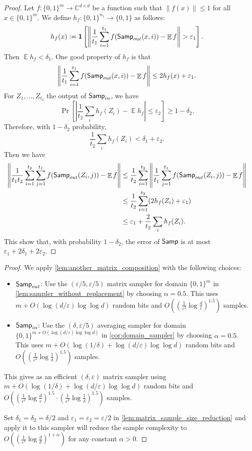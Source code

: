 \documentclass[11pt,letterpaper]{article}
\newcommand{\C}{\mathbb{C}}
\DeclareMathOperator*{\E}{\mathbb{E}}
\newcommand{\eps}{\varepsilon}
\newcommand{\1}{\mathbbm{1}}
\newcommand{\norm}[1]{\left\lVert #1\right\rVert}
\newcommand{\abs}[1]{\left|#1\right| }
\newcommand{\zo}{\{0, 1\}}
\newcommand{\Smp}{\textup{\textsf{Samp}}}
\begin{document}
\begin{proof}
    Let $f : \zo^m \to \C^{d \times d}$ be a function such that $\|f(x)\| \leq 1$ for all $x \in \zo^m$.
    We define $h_f:\zo^{n_1} \to \{0, 1\}$ as follows: \[
        h_f(x) := \mathbf{1}\left[\norm{\frac{1}{t_1}\sum_{i=1}^{t_1} f(\Smp_{out}(x, i)) - \E f} > \eps_1\right].
    \] Then $\E h_f < \delta_1$. One good property of $h_f$ is that \[
        \norm{\frac{1}{t_1}\sum_{i=1}^{t_1} f(\Smp_{out}(x, i)) - \E f} \le 2h_f(x) + \eps_1.
    \]
    For $Z_1, \dots, Z_{t_2}$ the output of $\Smp_{in}$, we have     \[
    \Pr
    \left[ \abs{\frac{1}{t_2}  \sum_i h_f(Z_i) - \E h_f} \leq \varepsilon_2 \right]
    \geq 1 - \delta_2.
    \]
    Therefore, with $1 - \delta_2$ probability, \[
        {\frac{1}{t_2}  \sum_i h_f(Z_i)} < \delta_1 + \eps_2.
    \]
    Then we have 
    \begin{align*}
        \norm{\frac{1}{t_1t_2}\sum_{i=1}^{t_2}\sum_{j=1}^{t_1}f(\Smp_{out}(Z_i, j)) - \E f} &\le \frac{1}{t_2}\sum_{i=1}^{t_2} \norm{\frac{1}{t_1} \sum_{j=1}^{t_1} f(\Smp_{out}(Z_i, j)) - \E f}  \\
        &\le \frac{1}{t_2}\sum_{i=1}^{t_2} (2h_f(Z_i) + \eps_1) \\
        &\le \eps_1 +  {\frac{2}{t_2}  \sum_i h_f(Z_i)}.
    \end{align*}
    This show that, with probability $1 - \delta_2$, the error of $\Smp$ is at most $\eps_1 + 2\delta_1 + 2\eps_2$.
\end{proof}
\samplerWithReplacement*
\begin{proof}
    We apply \cref{lem:another_matrix_composition} with the following choices:
    \begin{itemize}
        \item $\Smp_{out}$: Use the $(\eps / 5, \eps / 5)$ matrix sampler for domain $\zo^m$ in \cref{lem:sampler_without_replacement} by choosing $\alpha = 0.5$. This uses $m + O( \log(d / \eps) \log\log d)$ random bits and $O((\frac{1}{\eps^2}\log\frac{d}{\eps})^{1.5})$ samples.
        \item $\Smp_{in}$: Use the $(\delta, \eps / 5)$ averaging sampler for domain $\zo^{m + O( \log(d / \eps) \log\log d)}$ in \cref{cor:domain_sampler} by choosing $\alpha = 0.5$. This uses $m + O( \log (1 / \delta) + \log(d / \eps) \log\log d)$ random bits and $O((\frac{1}{\eps^2}\log\frac{1}{\delta})^{1.5})$ samples.
    \end{itemize}
    This gives as an efficient $(\delta, \eps)$ matrix sampler using $m + O( \log (1 / \delta) + \log(d / \eps) \log\log d)$ random bits and $O((\frac{1}{\eps^2}\log\frac{d}{\eps})^{1.5} \cdot (\frac{1}{\eps^2}\log\frac{1}{\delta})^{1.5})$ samples.   
    
    Set $\delta_1 = \delta_2 = \delta / 2$ and $\eps_1 = \eps_2 = \eps / 2$ in  \cref{lem:matrix_sample_size_reduction} and apply it to this sampler will reduce the sample complexity to $O((\frac{1}{\eps^2}\log\frac{d}{\delta})^{1 + \alpha})$ for any constant $\alpha > 0$.
\end{proof}
\end{document}
